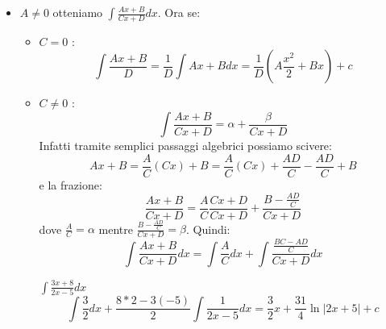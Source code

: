 \begin{itemize}
    \item $A\neq0$ otteniamo $\int\frac{Ax+B}{Cx+D}dx$. Ora se:
    \begin{itemize}
        \item $C=0$ : \begin{equation*}\int\frac{Ax+B}{D}=\frac{1}{D}\int Ax+Bdx=\frac{1}{D}(A\frac{x^2}{2}+Bx)+c\end{equation*}
        \item $C\neq 0$ : \begin{equation*}\int\frac{Ax+B}{Cx+D}=\alpha+\frac{\beta}{Cx+D}\end{equation*}
        Infatti tramite semplici passaggi algebrici possiamo scivere:
        \begin{equation*}Ax+B=\frac{A}{C}(Cx)+B=\frac{A}{C}(Cx)+\frac{AD}{C}-\frac{AD}{C}+B\end{equation*}
        e la frazione:
        \begin{equation*}\frac{Ax+B}{Cx+D}=\frac{A}{C}\frac{Cx+D}{Cx+D}+\frac{B-\frac{AD}{C}}{Cx+D}\end{equation*}
        dove $\frac{A}{C}=\alpha$ mentre $\frac{B-\frac{AD}{C}}{Cx+D}=\beta$.
        Quindi:
        \begin{equation*}\int\frac{Ax+B}{Cx+D}dx=\int\frac{A}{C}dx+\int\frac{\frac{BC-AD}{C}}{Cx+D}dx\end{equation*}
        \begin{example}$\int\frac{3x+8}{2x-5}dx$\begin{equation*}\int\frac{3}{2}dx+\frac{8*2-3(-5)}{2}\int\frac{1}{2x-5}dx=\frac{3}{2}x+\frac{31}{4}\ln|2x+5|+c\end{equation*}
        \end{example}
    \end{itemize}
\end{itemize}
    


